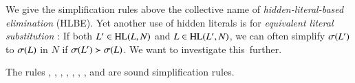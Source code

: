 We give the simplification rules above the collective name of
\emph{hidden-literal-based elimination} (HLBE).
Yet another use of hidden literals is for \emph{equivalent literal
substitution} \cite{hjb-2010-cl-elim}: If both $L' \in \mathrm{HL}(L, N)$ and $L
\in \mathrm{HL}(L', N)$, we can often simplify $\sigma(L')$ to $\sigma(L)$ in $N$ if
$\sigma(L') \succ \sigma(L)$. We want to investigate this~further.


\begin{theorem}
\begin{sloppypar}
The rules , , ,
, , ,
, and  are sound simplification rules.
\end{sloppypar}
\end{theorem}

